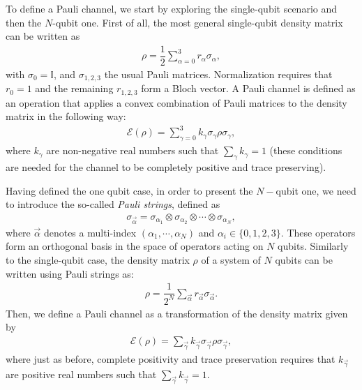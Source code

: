 \documentclass[10pt,letterpaper]{article}
\begin{document}
To define a Pauli channel, we start by exploring the single-qubit scenario and then the $N$-qubit one. 
First of all, the most general single-qubit density matrix can be written as
\begin{eqnarray}
\label{ec: Density Matrix}
\rho = \dfrac{1}{2} \sum_{\alpha=0}^{3} r_{\alpha} \sigma_{\alpha},
\end{eqnarray}
with $\sigma_0 = \mathbb{I}$, and $\sigma_{1,2,3}$ the usual Pauli matrices. 
Normalization requires that $r_0 = 1$ and the remaining $r_{1,2,3}$ form a Bloch vector. 
A Pauli channel is defined as an operation
that applies a convex combination of Pauli matrices to the density matrix in the following way:
\begin{eqnarray}
\label{ec: Pauli channel 1 qbit}
\mathcal{E}(\rho) = \sum_{\gamma=0}^3 k_{\gamma} \sigma_{\gamma} \rho \sigma_{\gamma},
\end{eqnarray}
where $k_{\gamma}$ are non-negative real numbers such that 
$\sum_{\gamma} k_{\gamma} = 1$ (these conditions are needed for the channel 
to be completely positive and trace preserving). 

Having defined the one qubit case, 
in order to present the $N-$qubit one, we 
need to introduce the so-called \textit{Pauli strings}, defined as
\begin{eqnarray}
\label{ec: Pauli string}
\sigma_{\vec{\alpha}} = \sigma_{\alpha_1} \otimes \sigma_{\alpha_2}\otimes \cdots \otimes \sigma_{\alpha_N},
\end{eqnarray}
where $\vec{\alpha}$ denotes a multi-index $(\alpha_1, \cdots, \alpha_N)$
 and $\alpha_i \in \{0,1,2,3\}$. 
 These operators form an orthogonal basis in the space of operators acting on $N$ qubits. 
 Similarly to the single-qubit case, the density matrix $\rho$ 
of a system of $N$ qubits can be written using Pauli strings as:
\begin{eqnarray}
\label{ec:  Density matrix Nqbit}
\rho = \dfrac{1}{2^N} \sum_{\vec{\alpha}} r_{\vec{\alpha}} \sigma_{\vec{\alpha}}.
\end{eqnarray}
Then, we define a Pauli channel as a transformation of the density 
matrix given by
\begin{eqnarray}
\label{ec: pauli channel N-qubt}
\mathcal{E}(\rho) = \sum_{\vec{\gamma}} k_{\vec{\gamma}} \sigma_{\vec{\gamma}} \rho \sigma_{\vec{\gamma}},
\end{eqnarray}
where just as before, complete positivity and trace preservation requires
that $k_{\vec{\gamma}}$ are positive real numbers such 
that $\sum_{\vec{\gamma}} k_{\vec{\gamma}}=1$.
\end{document}
